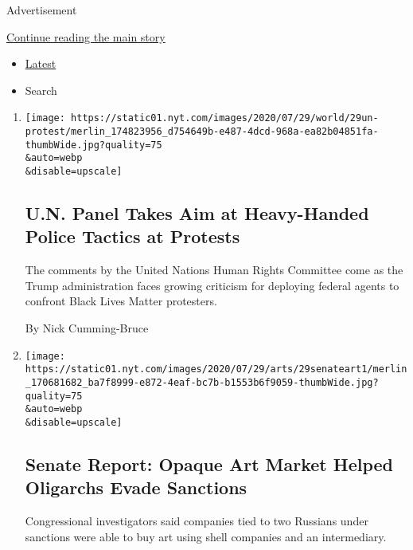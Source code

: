 Advertisement

\protect\hyperlink{after-mid3}{Continue reading the main story}

\begin{itemize}
\tightlist
\item
  \protect\hyperlink{stream-panel}{Latest}
\item
  Search
\end{itemize}

\begin{enumerate}
\def\labelenumi{\arabic{enumi}.}
\item
  \href{/2020/07/29/world/americas/united-nations-portland-protests.html}{}

  \texttt{[image: https://static01.nyt.com/images/2020/07/29/world/29un-protest/merlin\_174823956\_d754649b-e487-4dcd-968a-ea82b04851fa-thumbWide.jpg?quality=75\\\&auto=webp\\\&disable=upscale]}

  \hypertarget{un-panel-takes-aim-at-heavy-handed-police-tactics-at-protests}{%
  \subsection{U.N. Panel Takes Aim at Heavy-Handed Police Tactics at
  Protests}\label{un-panel-takes-aim-at-heavy-handed-police-tactics-at-protests}}

  The comments by the United Nations Human Rights Committee come as the
  Trump administration faces growing criticism for deploying federal
  agents to confront Black Lives Matter protesters.

  By Nick Cumming-Bruce
\item
  \href{/2020/07/29/arts/design/senate-report-art-market-russia-oligarchs-sanctions.html}{}

  \texttt{[image: https://static01.nyt.com/images/2020/07/29/arts/29senateart1/merlin\_170681682\_ba7f8999-e872-4eaf-bc7b-b1553b6f9059-thumbWide.jpg?quality=75\\\&auto=webp\\\&disable=upscale]}

  \hypertarget{senate-report-opaque-art-market-helped-oligarchs-evade-sanctions}{%
  \subsection{Senate Report: Opaque Art Market Helped Oligarchs Evade
  Sanctions}\label{senate-report-opaque-art-market-helped-oligarchs-evade-sanctions}}

  Congressional investigators said companies tied to two Russians under
  sanctions were able to buy art using shell companies and an
  intermediary.


\end{enumerate}
